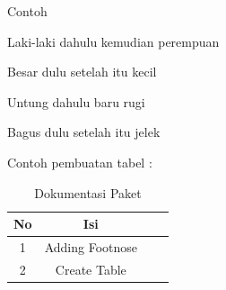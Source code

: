 \vspace{\baselineskip}
\noindent Contoh\par

\vspace{\baselineskip}

Laki-laki dahulu kemudian perempuan\par

\vspace{\baselineskip}
Besar dulu setelah itu kecil\par

\vspace{\baselineskip}
Untung dahulu baru rugi \par

\vspace{\baselineskip}
Bagus dulu setelah itu jelek\par

Contoh pembuatan tabel :
\begin{table}[ht]
	\caption{Dokumentasi Paket}
	\centering
	\begin{tabular}{cccc}
		\hline
		No&Isi\\
		\hline
		1&Adding Footnose&\\
		2&Create Table&\\
		\hline
	\end{tabular}
\end{table}
